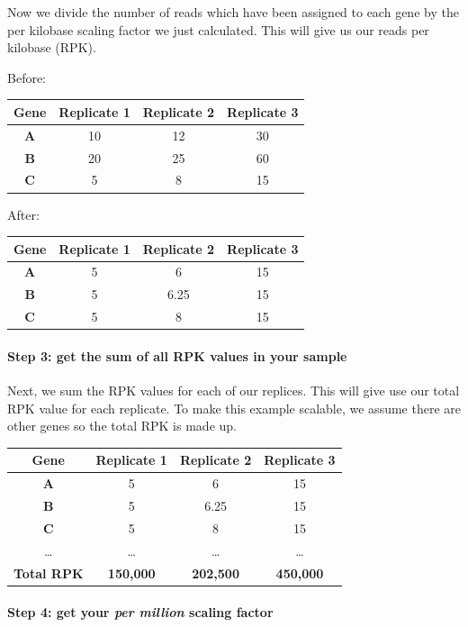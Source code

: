 \documentclass[11pt]{article}
\begin{document}
Now we divide the number of reads which have been assigned to each gene
by the per kilobase scaling factor we just calculated. This will give us
our reads per kilobase (RPK).

Before:

\begin{longtable}[]{@{}cccc@{}}
\toprule
Gene & Replicate 1 & Replicate 2 & Replicate 3\tabularnewline
\midrule
\endhead
\textbf{A} & 10 & 12 & 30\tabularnewline
\textbf{B} & 20 & 25 & 60\tabularnewline
\textbf{C} & 5 & 8 & 15\tabularnewline
\bottomrule
\end{longtable}

\newpage

After:

\begin{longtable}[]{@{}cccc@{}}
\toprule
Gene & Replicate 1 & Replicate 2 & Replicate 3\tabularnewline
\midrule
\endhead
\textbf{A} & 5 & 6 & 15\tabularnewline
\textbf{B} & 5 & 6.25 & 15\tabularnewline
\textbf{C} & 5 & 8 & 15\tabularnewline
\bottomrule
\end{longtable}

\hypertarget{step-3-get-the-sum-of-all-rpk-values-in-your-sample}{%
\paragraph{Step 3: get the sum of all RPK values in your
sample}\label{step-3-get-the-sum-of-all-rpk-values-in-your-sample}}

Next, we sum the RPK values for each of our replices. This will give use
our total RPK value for each replicate. To make this example scalable,
we assume there are other genes so the total RPK is made up.

\begin{longtable}[]{@{}cccc@{}}
\toprule
Gene & Replicate 1 & Replicate 2 & Replicate 3\tabularnewline
\midrule
\endhead
\textbf{A} & 5 & 6 & 15\tabularnewline
\textbf{B} & 5 & 6.25 & 15\tabularnewline
\textbf{C} & 5 & 8 & 15\tabularnewline
\ldots{} & \ldots{} & \ldots{} & \ldots{}\tabularnewline
\textbf{Total RPK} & \textbf{150,000} & \textbf{202,500} &
\textbf{450,000}\tabularnewline
\bottomrule
\end{longtable}

\hypertarget{step-4-get-your-per-million-scaling-factor}{%
\paragraph{\texorpdfstring{Step 4: get your \textit{per million} scaling
factor}{Step 4: get your per million scaling factor}}\label{step-4-get-your-per-million-scaling-factor}}
\end{document}
